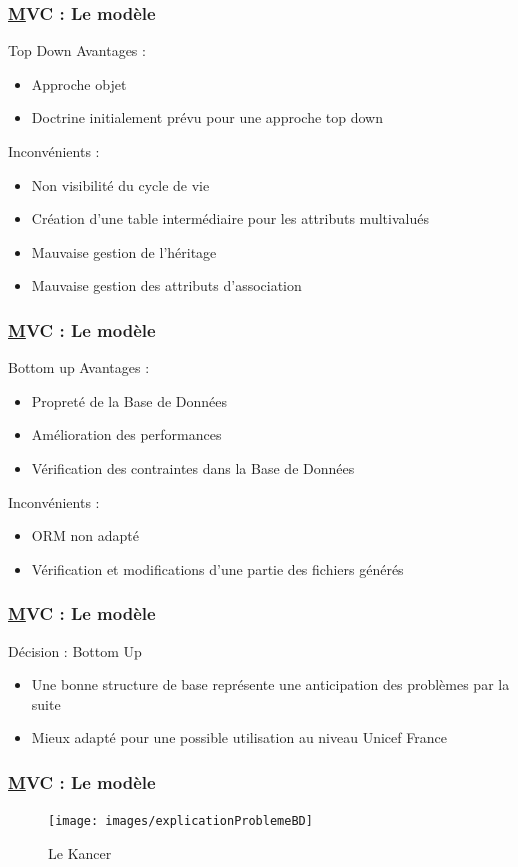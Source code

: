 \speaker{\Julie}
\begin{frame}
	\frametitle{\underline{M}VC : Le modèle}
	\begin{block}{Top Down}
		Avantages :
		\begin{itemize}
			\item Approche objet
			\item Doctrine initialement prévu pour une approche top down
		\end{itemize}
 
		Inconvénients :
		\begin{itemize}
			\item Non visibilité du cycle de vie
			\item Création d'une table intermédiaire pour les attributs multivalués
			\item Mauvaise gestion de l'héritage
			\item Mauvaise gestion des attributs d'association
			
		\end{itemize}
	\end{block}
\end{frame}


\begin{frame}
	\frametitle{\underline{M}VC : Le modèle}
	\begin{block}{Bottom up}
	Avantages :
		\begin{itemize}
			\item Propreté de la Base de Données
			\item Amélioration des performances
			\item Vérification des contraintes dans la Base de Données
		\end{itemize} 
	Inconvénients :
		\begin{itemize}
			\item ORM non adapté
			\item Vérification et modifications d'une partie des fichiers générés
		\end{itemize}
	\end{block}
  
\end{frame}


\begin{frame}
	\frametitle{\underline{M}VC : Le modèle}
	\begin{block}{Décision : Bottom Up}
		\begin{itemize}
		\item Une bonne structure de base représente une anticipation des problèmes par la suite 
		\item Mieux adapté pour une possible utilisation au niveau Unicef France
		\end{itemize}
		
		
	\end{block}
\end{frame}


\begin{frame}
	\frametitle{\underline{M}VC : Le modèle}
		\begin{figure}[!h]
			\begin{center}
				\texttt{[image: images/explicationProblemeBD]}
				\caption{Le Kancer}
			\end{center}
		\end{figure}
\end{frame}